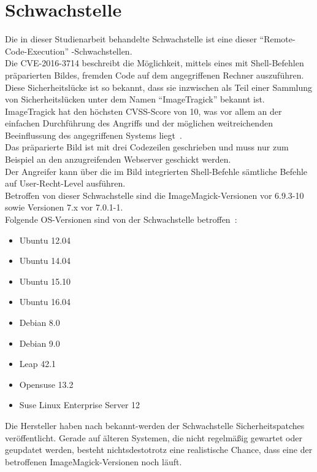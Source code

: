 \section{Schwachstelle}\label{sec:schwachstelle}

Die in dieser Studienarbeit behandelte Schwachstelle ist eine dieser "`Remote-Code-Execution"' -Schwachstellen.\\

Die CVE-2016-3714 beschreibt die Möglichkeit, mittels eines mit Shell-Befehlen präparierten Bildes, fremden Code auf dem angegriffenen Rechner auszuführen.\\

Diese Sicherheitslücke ist so bekannt, dass sie inzwischen als Teil einer Sammlung von Sicherheitslücken unter dem Namen "`ImageTragick"' bekannt ist.\\

ImageTragick hat den höchsten CVSS-Score von 10, was vor allem an der einfachen Durchführung des Angriffs und der möglichen weitreichenden Beeinflussung des angegriffenen Systems liegt~\cite{ImagemagickProductsVulnerabilities}.\\
Das präparierte Bild ist mit drei Codezeilen geschrieben und muss nur zum Beispiel an den anzugreifenden Webserver geschickt werden.\\
Der Angreifer kann über die im Bild integrierten Shell-Befehle sämtliche Befehle auf User-Recht-Level ausführen.\\

Betroffen von dieser Schwachstelle sind die ImageMagick-Versionen vor 6.9.3-10 sowie Versionen 7.x vor 7.0.1-1.\\
Folgende OS-Versionen sind von der Schwachstelle betroffen~\cite{CVE20163714EPHEMERALHTTPS}:
\begin{itemize}
    \item Ubuntu 12.04
    \item Ubuntu 14.04
    \item Ubuntu 15.10
    \item Ubuntu 16.04
    \item Debian 8.0
    \item Debian 9.0
    \item Leap 42.1
    \item Opensuse 13.2
    \item Suse Linux Enterprise Server 12
\end{itemize}

Die Hersteller haben nach bekannt-werden der Schwachstelle Sicherheitspatches veröffentlicht.
Gerade auf älteren Systemen, die nicht regelmäßig gewartet oder geupdatet werden,
besteht nichtsdestotrotz eine realistische Chance, dass eine der betroffenen ImageMagick-Versionen noch läuft.\\